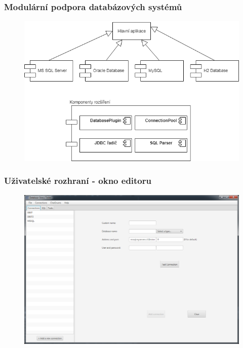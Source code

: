 \documentclass{beamer}
\begin{document}
\begin{frame}
  \frametitle{Modulární podpora databázových systémů}
  
    \begin{figure}[h]
  \centering
\includegraphics[width=1.0\textwidth]{img/plugins.png}
\end{figure}
\end{frame}



\begin{frame}
  \frametitle{Uživatelské rozhraní - okno editoru}
  \begin{figure}[h]
  \centering
\includegraphics[width=1.0\textwidth]{img/coneditor.png}
\end{figure}

\end{frame}
\end{document}
